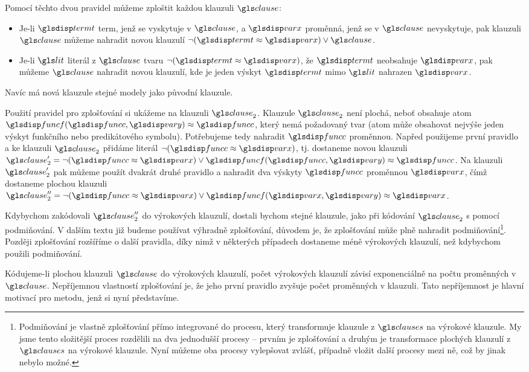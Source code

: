 Pomocí těchto dvou pravidel můžeme zploštit každou
klauzuli $\clause$:
\begin{itemize}
\item Je-li $\term$ term, jenž se vyskytuje v $\clause$, a $\var$ proměnná,
  jenž se v $\clause$ nevyskytuje, pak klauzuli $\clause$ můžeme
  nahradit novou klauzulí $\neg (\term \approx \var) \vee \clause$.
\item Je-li $\lit$ literál z $\clause$ tvaru $\neg (\term \approx \var)$,
  že $\term$ neobsahuje $\var$,
  pak můžeme $\clause$ nahradit novou klauzulí, kde je jeden výskyt $\term$
  mimo $\lit$ nahrazen $\var$.
\end{itemize}
Navíc má nová klauzule stejné modely jako původní klauzule.

Použití pravidel pro zplošťování si ukážeme na klauzuli $\clause_2$.
Klauzule $\clause_2$ není plochá, neboť obsahuje atom
$\func(\funcC, \varY) \approx \funcC$, který nemá požadovaný tvar
(atom může obsahovat nejvýše jeden výskyt funkčního nebo predikátového
symbolu). Potřebujeme tedy nahradit $\funcC$ proměnnou.
Napřed použijeme první pravidlo a ke klauzuli $\clause_2$ přidáme literál
$\neg (\funcC \approx \var)$, tj. dostaneme novou klauzuli
$\clause_2' = \neg (\funcC \approx \var) \vee
  \func(\funcC, \varY) \approx \funcC$.
Na klauzuli $\clause_2'$ pak můžeme použít dvakrát druhé pravidlo
a nahradit dva výskyty $\funcC$ proměnnou $\var$, čímž
dostaneme plochou klauzuli
$\clause_2'' = \neg (\funcC \approx \var) \vee
\func(\var, \varY) \approx \var$.

Kdybychom zakódovali
$\clause_2''$ do výrokových klauzulí, dostali bychom stejné klauzule,
jako při kódování $\clause_2$ s pomocí podmiňování.
V dalším textu již budeme používat výhradně zplošťování,
důvodem je, že zplošťování může plně nahradit
podmiňování\footnote{Podmiňování je vlastně zplošťování
přímo integrované do procesu, který transformuje klauzule z $\clauses$
na výrokové klauzule. My jsme tento složitější proces rozdělili na dva
jednodušší procesy -- prvním je zplošťování a druhým je transformace
plochých klauzulí z $\clauses$ na výrokové klauzule. Nyní
můžeme oba procesy vylepšovat zvlášť, případně vložit další procesy mezi
ně, což by jinak nebylo možné.}.
Později zplošťování rozšíříme o další pravidla,
díky nimž v některých případech dostaneme méně výrokových klauzulí,
než kdybychom použili podmiňování.

Kódujeme-li plochou klauzuli $\clause$ do výrokových klauzulí,
počet výrokových klauzulí závisí exponenciálně na počtu proměnných
v $\clause$.
Nepříjemnou vlastností zplošťování je, že jeho první pravidlo
zvyšuje počet proměnných v klauzuli. Tato nepříjemnost je hlavní motivací
pro metodu, jenž si nyní představíme.

